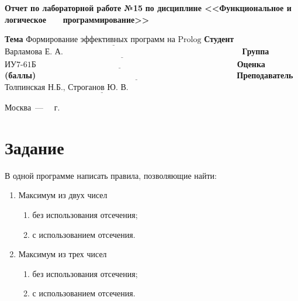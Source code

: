 \documentclass[12pt]{report}
\begin{document}
\begin{titlepage}
		\begin{center}
			\noindent\begin{minipage}{1.1\textwidth}\centering
				\Large\textbf{Отчет по лабораторной работе №15}\newline
				\textbf{по дисциплине <<Функциональное и логическое}\newline
				\textbf{~~~программирование>>}\newline\newline
			\end{minipage}
		\end{center}
		
		\noindent\textbf{Тема} $\underline{\text{Формирование эффективных программ на Prolog}}$\newline\newline
		\noindent\textbf{Студент} $\underline{\text{Варламова Е. А.~~~~~~~~~~~~~~~~~~~~~~~~~~~~~~~~~~~~~~~~~~~~~~~~~~~~~~~~~~~~~~~~~}}$\newline\newline
		\noindent\textbf{Группа} $\underline{\text{ИУ7-61Б~~~~~~~~~~~~~~~~~~~~~~~~~~~~~~~~~~~~~~~~~~~~~~~~~~~~~~~~~~~~~~~~~~~~~~~~~}}$\newline\newline
		\noindent\textbf{Оценка (баллы)} $\underline{\text{~~~~~~~~~~~~~~~~~~~~~~~~~~~~~~~~~~~~~~~~~~~~~~~~~~~~~~~~~~~~~~~~~~~~~~~~}}$\newline\newline
		\noindent\textbf{Преподаватель} $\underline{\text{Толпинская Н.Б., Строганов Ю. В.~~~~~~~~~~~~~~~~~~~~~~~~~~}}$\newline\newline\newline
		
		\begin{center}
			\vfill
			Москва~---~\the\year
			~г.
		\end{center}
	\end{titlepage}
\section*{Задание}
В одной программе написать правила, позволяющие найти:
\begin{enumerate}
    \item Максимум из двух чисел
    \begin{enumerate}
        \item без использования отсечения;
        \item с использованием отсечения.
    \end{enumerate}
        \item Максимум из трех чисел
    \begin{enumerate}
        \item без использования отсечения;
        \item с использованием отсечения.
    \end{enumerate}
\end{enumerate}
\end{document}
